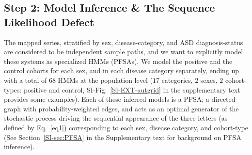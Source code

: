 \documentclass[onecolumn,,10pt]{IEEEtran}
\gdef\treatment{positive\xspace}
\begin{document}
\subsection{Step 2: Model Inference \& The Sequence Likelihood Defect}
The mapped series, stratified by  sex, disease-category, and ASD diagnosis-status are considered to be independent sample paths, and we want to explicitly model these systems as specialized HMMs (PFSAs). We model the \treatment and the control cohorts for each sex, and in  each disease category separately, ending up with a total of $68$ HMMs at the population level ($17$ categories, $2$ sexes, $2$ cohort-types: \treatment and control, SI-Fig.~\ref{SI-EXT-autgrid} in the supplementary text provides some examples). Each of these inferred models is  a PFSA;  a directed graph with probability-weighted edges, and acts as an optimal generator of the  stochastic process driving the  sequential appearance of the three letters (as defined by Eq.~\eqref{eq1})  corresponding to each sex, disease category, and cohort-type (See Section~\ref{SI-sec:PFSA} in the Supplementary text for  background on PFSA inference). 
\end{document}
